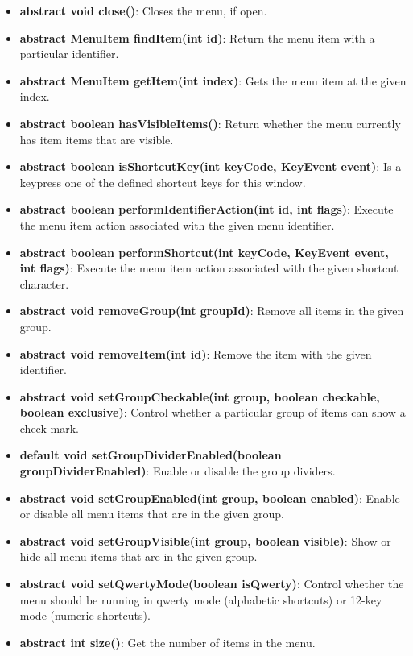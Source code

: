 \documentclass{report}
\begin{document}
\begin{itemize}
\begin{itemize}
                \item \textbf{abstract void	close()}: Closes the menu, if open.
                \item \textbf{abstract MenuItem	findItem(int id)}: Return the menu item with a particular identifier.
                \item \textbf{abstract MenuItem	getItem(int index)}: Gets the menu item at the given index.
                \item \textbf{abstract boolean	hasVisibleItems()}: Return whether the menu currently has item items that are visible.
                \item \textbf{abstract boolean	isShortcutKey(int keyCode, KeyEvent event)}: Is a keypress one of the defined shortcut keys for this window.
                \item \textbf{abstract boolean	performIdentifierAction(int id, int flags)}: Execute the menu item action associated with the given menu identifier.
                \item \textbf{abstract boolean	performShortcut(int keyCode, KeyEvent event, int flags)}: Execute the menu item action associated with the given shortcut character.
                \item \textbf{abstract void	removeGroup(int groupId)}: Remove all items in the given group.
                \item \textbf{abstract void	removeItem(int id)}: Remove the item with the given identifier.
                \item \textbf{abstract void	setGroupCheckable(int group, boolean checkable, boolean exclusive)}: Control whether a particular group of items can show a check mark.
                \item \textbf{default void	setGroupDividerEnabled(boolean groupDividerEnabled)}: Enable or disable the group dividers.
                \item \textbf{abstract void	setGroupEnabled(int group, boolean enabled)}: Enable or disable all menu items that are in the given group.
                \item \textbf{abstract void	setGroupVisible(int group, boolean visible)}: Show or hide all menu items that are in the given group.
                \item \textbf{abstract void	setQwertyMode(boolean isQwerty)}: Control whether the menu should be running in qwerty mode (alphabetic shortcuts) or 12-key mode (numeric shortcuts).
                \item \textbf{abstract int	size()}: Get the number of items in the menu.

\end{itemize}
\end{itemize}
\end{document}
